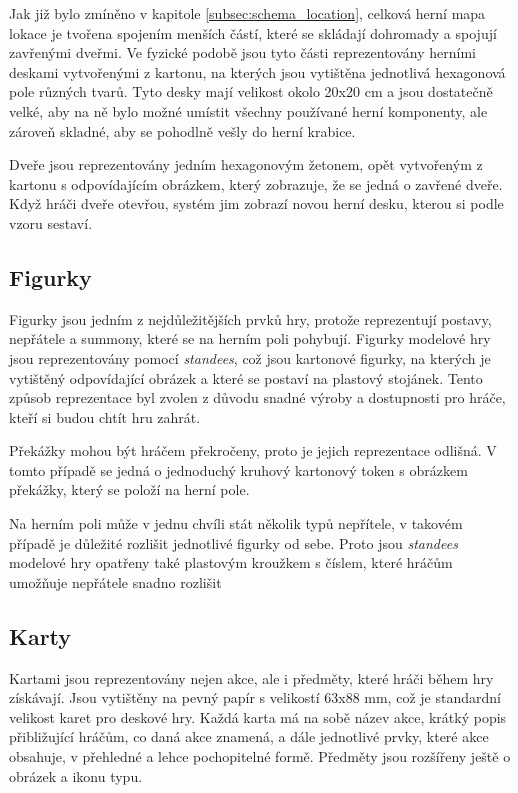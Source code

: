Jak již bylo zmíněno v kapitole \ref{subsec:schema_location}, celková herní mapa lokace je tvořena spojením menších částí, které se skládají dohromady a spojují zavřenými dveřmi. Ve fyzické podobě jsou tyto části reprezentovány herními deskami vytvořenými z kartonu, na kterých jsou vytištěna jednotlivá hexagonová pole různých tvarů. Tyto desky mají velikost okolo 20x20 cm a jsou dostatečně velké, aby na ně bylo možné umístit všechny používané herní komponenty, ale zároveň skladné, aby se pohodlně vešly do herní krabice.

Dveře jsou reprezentovány jedním hexagonovým žetonem, opět vytvořeným z kartonu s odpovídajícím obrázkem, který zobrazuje, že se jedná o zavřené dveře. Když hráči dveře otevřou, systém jim zobrazí novou herní desku, kterou si podle vzoru sestaví.

\subsection{Figurky}
\label{subsec:design_figurines}

Figurky jsou jedním z nejdůležitějších prvků hry, protože reprezentují postavy, nepřátele a summony, které se na herním poli pohybují. Figurky modelové hry jsou reprezentovány pomocí \textit{standees}, což jsou kartonové figurky, na kterých je vytištěný odpovídající obrázek a které se postaví na plastový stojánek. Tento způsob reprezentace byl zvolen z důvodu snadné výroby a dostupnosti pro hráče, kteří si budou chtít hru zahrát.

Překážky mohou být hráčem překročeny, proto je jejich reprezentace odlišná. V tomto případě se jedná o jednoduchý kruhový kartonový token s obrázkem překážky, který se položí na herní pole.

Na herním poli může v jednu chvíli stát několik typů nepřítele, v takovém případě je důležité rozlišit jednotlivé figurky od sebe. Proto jsou \textit{standees} modelové hry opatřeny také plastovým kroužkem s číslem, které hráčům umožňuje nepřátele snadno rozlišit

\subsection{Karty}
\label{subsec:design_cards}

Kartami jsou reprezentovány nejen akce, ale i předměty, které hráči během hry získávají. Jsou vytištěny na pevný papír s velikostí 63x88 mm, což je standardní velikost karet pro deskové hry. Každá karta má na sobě název akce, krátký popis přibližující hráčům, co daná akce znamená, a dále jednotlivé prvky, které akce obsahuje, v přehledné a lehce pochopitelné formě. Předměty jsou rozšířeny ještě o obrázek a ikonu typu.

